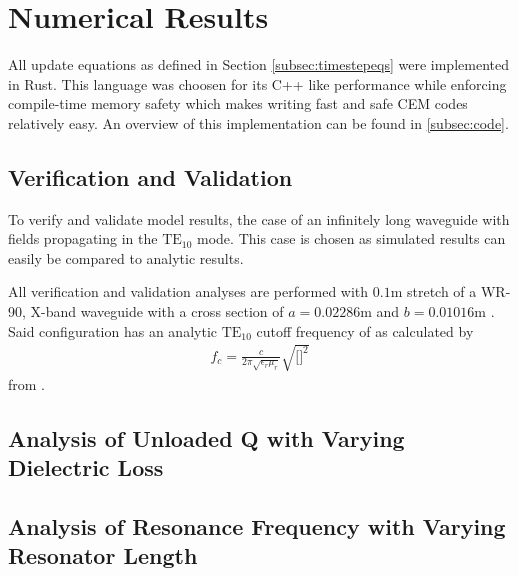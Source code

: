 \section{Numerical Results}
\label{sec:numres} 
All update equations as defined in Section \ref{subsec:timestepeqs} were implemented in Rust. This language was choosen for its C++ like performance while enforcing compile-time memory safety which makes writing fast and safe CEM codes relatively easy. An overview of this implementation can be found in \ref{subsec:code}.

\subsection{Verification and Validation}
\label{subsec:vv}
To verify and validate model results, the case of an infinitely long waveguide with fields propagating in the $\mathrm{TE_{10}}$ mode. This case is chosen as simulated results can easily be compared to analytic results.

All verification and validation analyses are performed with $0.1$m stretch of a WR-90, X-band waveguide with a cross section of $a=0.02286$m and $b=0.01016$m \cite{everythingrf}. Said configuration has an analytic $\mathrm{TE_{10}}$ cutoff frequency of as calculated by
\begin{align}
    f_c=\frac{c}{2\pi\sqrt{\epsilon_r\mu_r}}\sqrt{\bigg[\bigg]^2}
    \label{eq:analytic-cutoff}
\end{align}
from \cite{pozar2011microwave}.

\subsection{Analysis of Unloaded Q with Varying Dielectric Loss}
\label{subsec:dielectric-loss}

\subsection{Analysis of Resonance Frequency with Varying Resonator Length}
\label{subsec:resonance-length}
